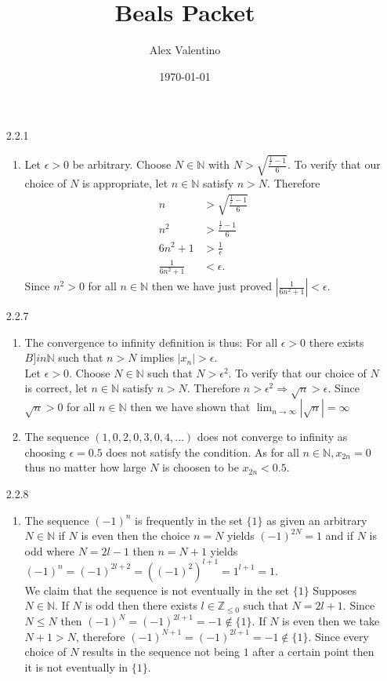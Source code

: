 \documentclass[12pt, letterpaper]{article}
\date{\today}
\author{Alex Valentino}
\title{Beals Packet}
\newcommand{\Z}{\mathbb{Z}}
\newcommand{\N}{\mathbb{N}}
\begin{document}
	\begin{enumerate}
		\item[2.2.1]
		\begin{enumerate}
			\item Let $\epsilon > 0$ be arbitrary.  Choose $N \in \N$ with $N > \sqrt{\frac{\frac{1}{\epsilon} -1 }{6}}$.  To verify that our choice of $N$ is appropriate, let $n \in \N$ satisfy $n > N$.  Therefore 
			\begin{align*}
				n &> \sqrt{\frac{\frac{1}{\epsilon} -1 }{6}}\\
				n^2 &>  \frac{\frac{1}{\epsilon} -1 }{6}\\
				6n^2 + 1 &>  \frac{1}{\epsilon}\\
				\frac{1}{6n^2 + 1} &< \epsilon.
			\end{align*}
			Since $n^2 > 0$ for all $n \in \N$ then we have just proved $|\frac{1}{6n^2 + 1} | < \epsilon$.
		\end{enumerate}
		\item[2.2.7]
		\begin{enumerate}
		\item 		 The convergence to infinity definition is thus: For all $\epsilon > 0$ there exists $B ]in \N$ such that $n > N$ implies $|x_n| > \epsilon$.\\	
		Let $\epsilon > 0$.  Choose $N \in \N$ such that $N > \epsilon^2$.  To verify that our choice of $N$ is correct, let $n \in \N$ satisfy $n > N$.  Therefore $n > \epsilon^2 \Rightarrow \sqrt{n} > \epsilon$.  Since $\sqrt{n} > 0$ for all $n \in \N$ then we have shown that $\lim_{n \to \infty} |\sqrt{n}| = \infty$
		\item The sequence $(1,0,2,0,3,0,4,\ldots)$ does not converge to infinity as choosing $\epsilon = 0.5$ does not satisfy the condition.  As for all $n \in \N, x_{2n} = 0$ thus no matter how large $N$ is choosen to be $x_{2n} < 0.5$.  
\end{enumerate}
		\item[2.2.8]
		\begin{enumerate}
			\item The sequence $(-1)^n$ is frequently in the set $\{1\}$ as given an arbitrary $N \in \N$ if $N$ is even then the choice $n = N$ yields $(-1)^{2N} = 1$ and if $N$ is odd where $N = 2l - 1$ then $n = N + 1$ yields 
			$(-1)^n = (-1)^{2l + 2} = ((-1)^2)^{l+1} = 1^{l+1} = 1$.  \\
			We claim that the sequence is not eventually in the set $\{1\}$ Supposes $N \in \N$.  If $N$ is odd then there exists $l\in \Z_{\leq 0}$ such that $N = 2l+1$.  Since $N \leq N$ then $(-1)^N = (-1)^{2l + 1} = -1 \not \in \{1\}$. If $N$ is even then we take $N + 1 > N$, therefore $(-1)^{N + 1} = (-1)^{2l + 1} = -1 \not \in \{1\}$.  Since every choice of $N$ results in the sequence not being $1$ after a certain point then it is not eventually in $\{1\}$.

\end{enumerate}
\end{enumerate}
\end{document}
